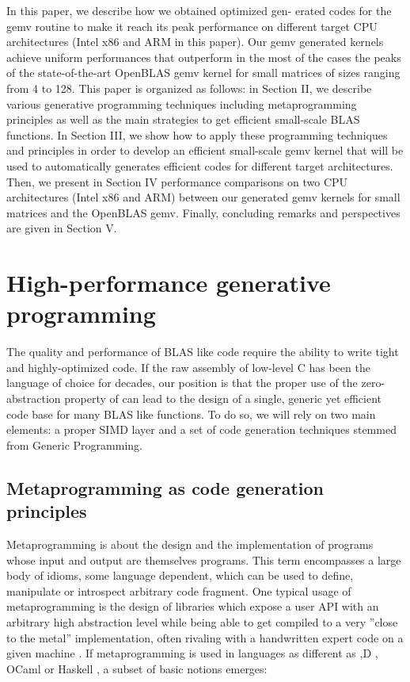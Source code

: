 \documentclass[../../main.tex]{subfiles}
\begin{document}
In this paper, we describe how we obtained optimized gen-
erated \cpp codes for the gemv routine to make it reach its
peak performance on different target CPU architectures (Intel
x86 and ARM in this paper). Our gemv \cpp generated kernels
achieve uniform performances that outperform in the most of
the cases the peaks of the state-of-the-art OpenBLAS gemv
kernel for small matrices of sizes ranging from 4 to 128.
This paper is organized as follows: in Section II, we describe
various generative programming techniques including metaprogramming
principles as well as the main strategies to get
efficient small-scale BLAS functions. In Section III, we show
how to apply these programming techniques and principles
in order to develop an efficient small-scale gemv kernel that
will be used to automatically generates efficient \cpp codes for
different target architectures. Then, we present in Section IV
performance comparisons on two CPU architectures (Intel
x86 and ARM) between our generated gemv kernels for
small matrices and the OpenBLAS gemv. Finally, concluding
remarks and perspectives are given in Section V.

\section{High-performance generative programming}

The quality and performance of BLAS like code require
the ability to write tight and highly-optimized code. If the
raw assembly of low-level C has been the language of choice
for decades, our position is that the proper use of the zero-
abstraction property of \cpp can lead to the design of a single,
generic yet efficient code base for many BLAS like functions.
To do so, we will rely on two main elements: a proper \cpp
SIMD layer and a set of code generation techniques stemmed
from Generic Programming.

\subsection{Metaprogramming as code generation principles}

Metaprogramming \cite{hpcs7} is about the design and the
implementation of programs whose input and output
are themselves programs. This term encompasses a large
body of idioms, some language dependent, which can be used
to define, manipulate or introspect arbitrary code fragment.
One typical usage of metaprogramming is the design of
libraries which expose a user API with an arbitrary high
abstraction level while being able to get compiled to a very
”close to the metal” implementation, often rivaling with a
handwritten expert code on a given machine \cite{hpcs8}.
If metaprogramming is used in languages as different as
\cpp \cite{hpcs9},D \cite{hpcs10}, OCaml \cite{hpcs11}
or Haskell \cite{hpcs12}, a subset of
basic notions emerges:
\end{document}
